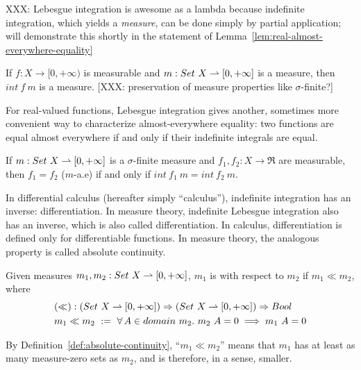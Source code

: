 XXX: Lebesgue integration is awesome as a lambda because indefinite integration, which yields a \emph{measure}, can be done simply by partial application; will demonstrate this shortly in the statement of Lemma~\ref{lem:real-almost-everywhere-equality}

\begin{lemma}
If $f : X \to [0,+\infty)$ is measurable and $m : Set~X \rightharpoonup [0,+\infty]$ is a measure, then $int~f~m$ is a measure.
[XXX: preservation of measure properties like $\sigma$-finite?]
\end{lemma}

For real-valued functions, Lebesgue integration gives another, sometimes more convenient way to characterize almost-everywhere equality: two functions are equal almost everywhere if and only if their indefinite integrals are equal.
\begin{lemma}
\label{lem:real-almost-everywhere-equality}
If $m : Set~X \rightharpoonup [0,+\infty]$ is a $\sigma$-finite measure and $f_1,f_2 : X \to \Re$ are measurable, then $f_1 = f_2$ ($m$-a.e) if and only if $int~f_1~m = int~f_2~m$.
\end{lemma}

In differential calculus (hereafter simply ``calculus''), indefinite integration has an inverse: differentiation.
In measure theory, indefinite Lebesgue integration also has an inverse, which is also called differentiation.
In calculus, differentiation is defined only for differentiable functions.
In measure theory, the analogous property is called absolute continuity.

\begin{definition}
\label{def:absolute-continuity}
Given measures $m_1,m_2 : Set~X \rightharpoonup [0,+\infty]$, $m_1$ is  with respect to $m_2$ if $m_1 \ll m_2$, where
\begin{equation}
\begin{aligned}
	&(\ll) : (Set~X \rightharpoonup [0,+\infty]) \Rightarrow (Set~X \rightharpoonup [0,+\infty]) \Rightarrow Bool \\
	&m_1 \ll m_2\ :=\ \forall\,{A \in domain~m_2}\ldotp\, m_2~A = 0 \implies m_1~A = 0
\end{aligned}
\end{equation}
\end{definition}

By Definition~\ref{def:absolute-continuity}, ``$m_1 \ll m_2$'' means that $m_1$ has at least as many measure-zero sets as $m_2$, and is therefore, in a sense, smaller.

